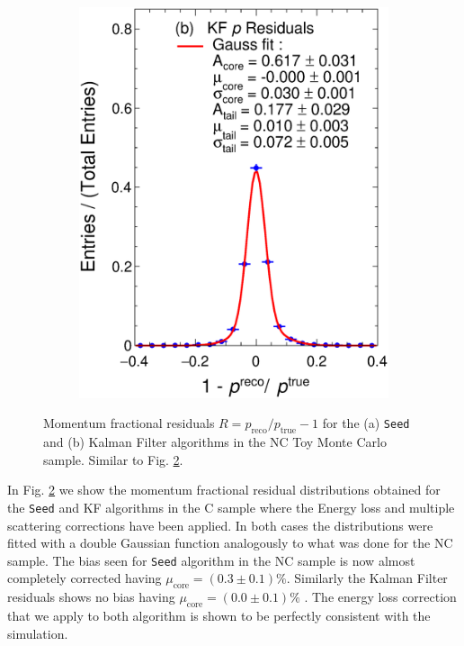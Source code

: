 \begin{figure}[t]
\begin{subfigure}[b]{0.48\textwidth}
         \includegraphics[width=\textwidth]{figures/ch4-KF_NDGArLite/Toy/Corr/pResKF_doublegauss.eps}
         \caption{}
         \label{fig:ToyResP_GArLite_Corr_KF}
     \end{subfigure}
        \caption{Momentum fractional residuals $R=p_{\text{reco}}/p_{\text{true}} - 1$ for the (a) \texttt{Seed} and (b) Kalman Filter algorithms in the NC Toy Monte Carlo sample. Similar to Fig. \ref{fig:ToyResP_GArLite_Corr}.} \label{fig:ToyResP_GArLite_Corr}
\end{figure}

In Fig. \ref{fig:ToyResP_GArLite_Corr} we show the momentum fractional residual distributions obtained for the \texttt{Seed} and KF algorithms in the C sample where the Energy loss and multiple scattering corrections have been applied. In both cases the distributions were fitted with a double Gaussian function analogously to what was done for the NC sample. The bias seen for \texttt{Seed} algorithm in the NC sample is now almost completely corrected having $\mu_\text{core}=(0.3\pm0.1)\%$. Similarly the Kalman Filter residuals shows no bias having  $\mu_\text{core}=(0.0\pm 0.1)\%$ . The energy loss correction that we apply to both algorithm is shown to be perfectly consistent with the simulation.

